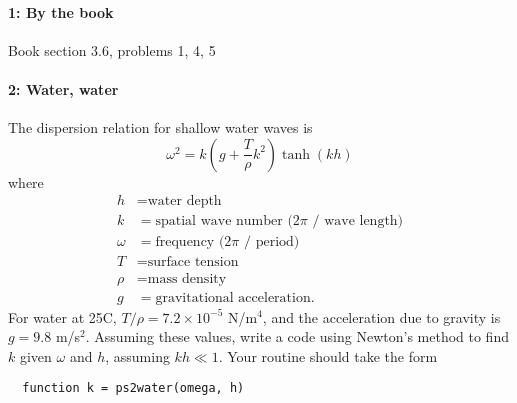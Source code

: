 \documentclass[12pt, leqno]{article}
\begin{document}

\paragraph*{1: By the book}
Book section 3.6, problems 1, 4, 5

\paragraph*{2: Water, water}
The dispersion relation for shallow water waves is
\[
  \omega^2 = k \left(g + \frac{T}{\rho} k^2 \right) \tanh(k h)
\]
where
\begin{align*}
  h &= \mbox{water depth} \\
  k &= \mbox{spatial wave number ($2\pi$ / wave length)} \\
  \omega &= \mbox{frequency ($2\pi$ / period)} \\
  T &= \mbox{surface tension} \\
  \rho &= \mbox{mass density} \\
  g &= \mbox{gravitational acceleration}.
\end{align*}
For water at 25C, $T/\rho = 7.2 \times 10^{-5}$ N/m$^4$, 
and the acceleration due to gravity is $g = 9.8$ m/s$^2$.
Assuming these values, write a code using Newton's method
to find $k$ given $\omega$ and $h$, assuming $kh \ll 1$.
Your routine should take the form
\begin{lstlisting}
  function k = ps2water(omega, h)
\end{lstlisting}
\end{document}
